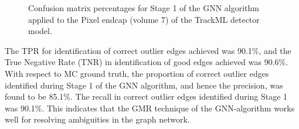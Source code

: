 \begin{figure}[htbp]%
    \centering
    \caption{Confusion matrix percentages for Stage 1 of the GNN algorithm applied to the Pixel endcap (volume 7) of the TrackML detector model.}
    \label{fig:confusion-matrix-endcap-stage-1}
\end{figure}

The TPR for identification of correct outlier edges achieved was 90.1\%, and the True Negative Rate (TNR) in identification of good edges achieved was 90.6\%. With respect to MC ground truth, the proportion of correct outlier edges identified during Stage 1 of the GNN algorithm, and hence the precision, was found to be 85.1\%. The recall in correct outlier edges identified during Stage 1 was 90.1\%. This indicates that the GMR technique of the GNN-algorithm works well for resolving ambiguities in the graph network.

